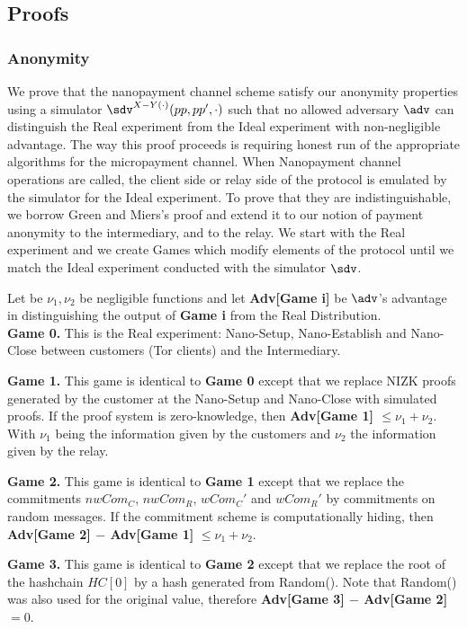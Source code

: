 \subsection{Proofs}

\subsubsection{Anonymity}

We prove that the nanopayment channel scheme satisfy our anonymity properties using a simulator $\sdv^{X-Y(\cdot)}(pp,pp',\cdot)$ such that no allowed adversary $\adv$ can distinguish the Real experiment from the Ideal experiment with non-negligible advantage. The way this proof proceeds is requiring honest run of the appropriate algorithms for the micropayment channel. When Nanopayment channel operations are called, the client side or relay side of the protocol is emulated by the simulator for the Ideal experiment. To prove that they are indistinguishable, we borrow Green and Miers's proof and extend it to our notion of payment anonymity to the intermediary, and to the relay. We start with the Real experiment and we create Games which modify elements of the protocol until we match the Ideal experiment conducted with the simulator $\sdv$.

Let be $\nu_1, \nu_2$ be negligible functions and let \textbf{Adv[Game i]} be $\adv$'s advantage in distinguishing the output of \textbf{Game i} from the Real Distribution. \\


\textbf{Game 0.} This is the Real experiment: Nano-Setup, Nano-Establish and Nano-Close between customers (Tor clients) and the Intermediary.

\textbf{Game 1.} This game is identical to \textbf{Game 0} except that we replace NIZK proofs generated by the customer at the Nano-Setup and Nano-Close with simulated proofs. If the proof system is zero-knowledge, then \textbf{Adv[Game 1] $\leq \nu_1 + \nu_2$}. With $\nu_1$ being the information given by the customers and $\nu_2$ the information given by the relay.

\textbf{Game 2.} This game is identical to \textbf{Game 1} except that we replace the commitments $nwCom_C$, $nwCom_R$, $wCom_C'$ and $wCom_R'$ by commitments on random messages. If the commitment scheme is computationally hiding, then \textbf{Adv[Game 2] $-$ Adv[Game 1]} $\leq \nu_1+\nu_2$.

\textbf{Game 3.} This game is identical to \textbf{Game 2} except that we replace  the root of the hashchain $HC[0]$ by a hash generated from Random(). Note that Random() was also used for the original value, therefore \textbf{Adv[Game 3] $-$ Adv[Game 2]} $= 0$.

